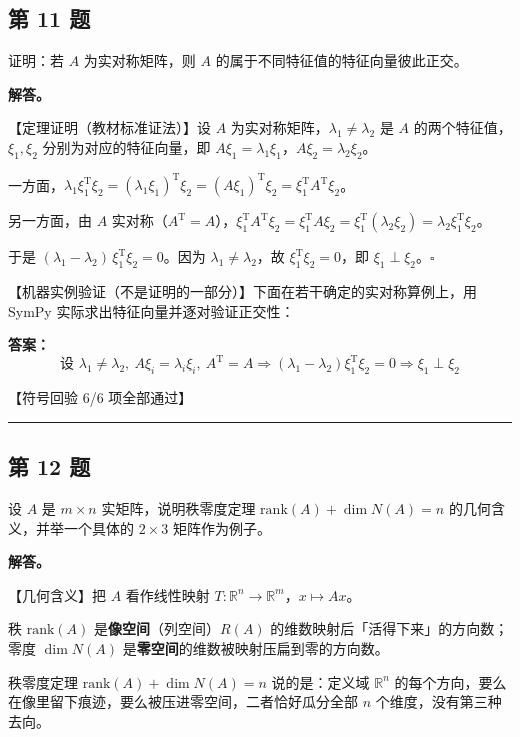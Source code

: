 \documentclass[12pt, a4paper]{article}
\newcommand{\problem}[1]{\subsection*{第 #1 题}}
\newcommand{\solution}{\textbf{解答。}}
\begin{document}
\problem{11}

证明：若 $A$ 为实对称矩阵，则 $A$ 的属于不同特征值的特征向量彼此正交。

\solution

【定理证明（教材标准证法）】设 $A$ 为实对称矩阵，$\lambda_1 \neq \lambda_2$ 是 $A$ 的两个特征值，$\xi_1, \xi_2$ 分别为对应的特征向量，即 $A\xi_1 = \lambda_1\xi_1$，$A\xi_2 = \lambda_2\xi_2$。

一方面，$\lambda_1 \xi_1^{\mathrm{T}}\xi_2 = (\lambda_1\xi_1)^{\mathrm{T}}\xi_2 = (A\xi_1)^{\mathrm{T}}\xi_2 = \xi_1^{\mathrm{T}}A^{\mathrm{T}}\xi_2$。

另一方面，由 $A$ 实对称（$A^{\mathrm{T}} = A$），$\xi_1^{\mathrm{T}}A^{\mathrm{T}}\xi_2 = \xi_1^{\mathrm{T}}A\xi_2 = \xi_1^{\mathrm{T}}(\lambda_2\xi_2) = \lambda_2\xi_1^{\mathrm{T}}\xi_2$。

于是 $(\lambda_1 - \lambda_2)\,\xi_1^{\mathrm{T}}\xi_2 = 0$。因为 $\lambda_1 \neq \lambda_2$，故 $\xi_1^{\mathrm{T}}\xi_2 = 0$，即 $\xi_1 \perp \xi_2$。$\square$

【机器实例验证（不是证明的一部分）】下面在若干确定的实对称算例上，用 SymPy 实际求出特征向量并逐对验证正交性：

\textbf{答案：}
\[\boxed{\text{设 } \lambda_1 \neq \lambda_2,\ A\xi_i = \lambda_i\xi_i,\ A^{\mathrm{T}} = A \Rightarrow (\lambda_1-\lambda_2)\xi_1^{\mathrm{T}}\xi_2 = 0 \Rightarrow \xi_1 \perp \xi_2}\]

\textcolor{okgreen}{【符号回验 6/6 项全部通过】}

\vspace{0.8em}
\hrule
\vspace{0.8em}

\problem{12}

设 $A$ 是 $m \times n$ 实矩阵，说明秩\textemdash{}零度定理 $\mathrm{rank}(A) + \dim N(A) = n$ 的几何含义，并举一个具体的 $2 \times 3$ 矩阵作为例子。

\solution

【几何含义】把 $A$ 看作线性映射 $T: \mathbb{R}^n \to \mathbb{R}^m$，$x \mapsto Ax$。

秩 $\mathrm{rank}(A)$ 是\textbf{像空间}（列空间）$R(A)$ 的维数\textemdash{}\textemdash{}映射后「活得下来」的方向数；零度 $\dim N(A)$ 是\textbf{零空间}的维数\textemdash{}\textemdash{}被映射压扁到零的方向数。

秩\textemdash{}零度定理 $\mathrm{rank}(A) + \dim N(A) = n$ 说的是：定义域 $\mathbb{R}^n$ 的每个方向，要么在像里留下痕迹，要么被压进零空间，二者恰好瓜分全部 $n$ 个维度，没有第三种去向。
\end{document}

